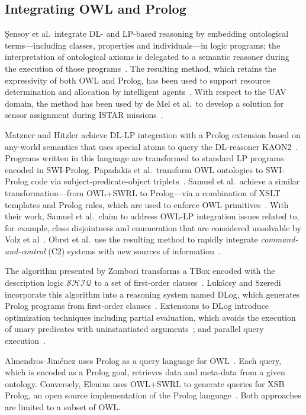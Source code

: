 \subsection{Integrating OWL and Prolog}

\c{S}ensoy et al.\ integrate DL- and LP-based reasoning by embedding ontological terms---including classes, properties and individuals---in logic programs; the interpretation of ontological axioms is delegated to a semantic reasoner during the execution of those programs~\cite{Sensoy_2011}. The resulting method, which retains the expressivity of both OWL and Prolog, has been used to support resource determination and allocation by intelligent agents~\cite{Sensoy_2012}. With respect to the UAV domain, the method has been used by de Mel et al.\ to develop a solution for sensor assignment during ISTAR missions~\cite{De_Mel_2013}.

Matzner and Hitzler achieve DL-LP integration with a Prolog extension based on any-world semantics that uses special atoms to query the DL-reasoner KAON2~\cite{Matzner_2007}. Programs written in this language are transformed to standard LP programs encoded in SWI-Prolog. Papadakis et al.\ transform OWL ontologies to SWI-Prolog code via subject-predicate-object triplets~\cite{Papadakis_2011}. Samuel et al.\ achieve a similar transformation---from OWL+SWRL to Prolog---via a combination of XSLT templates and Prolog rules, which are used to enforce OWL primitives~\cite{Samuel_2008}. With their work, Samuel et al.\ claim to address OWL-LP integration issues related to, for example, class disjointness and enumeration that are considered unsolvable by Volz et al~\cite{Volz_2003}. Obrst et al.\ use the resulting method to rapidly integrate \emph{command-and-control} (C2) systems with new sources of information~\cite{Obrst_2010}.

The algorithm presented by Zombori transforms a TBox encoded with the description logic $\mathcal{SHIQ}$ to a set of first-order clauses~\cite{Zombori_2008}. Luk\'{a}csy and Szeredi incorporate this algorithm into a reasoning system named DLog, which generates Prolog programs from first-order clauses~\cite{Lukacsy_2009a}. Extensions to DLog introduce optimization techniques including partial evaluation, which avoids the execution of unary predicates with uninstantiated arguments~\cite{Lukacsy_2008}; and parallel query execution~\cite{Lukacsy_2009b}.

Almendros-Jim\'{e}nez uses Prolog as a query language for OWL~\cite{Almendros_Jimenez_2011}. Each query, which is encoded as a Prolog goal, retrieves data and meta-data from a given ontology. Conversely, Elenius uses OWL+SWRL to generate queries for XSB Prolog, an open source implementation of the Prolog language~\cite{Elenius_2012}. Both approaches are limited to a subset of OWL\@.

